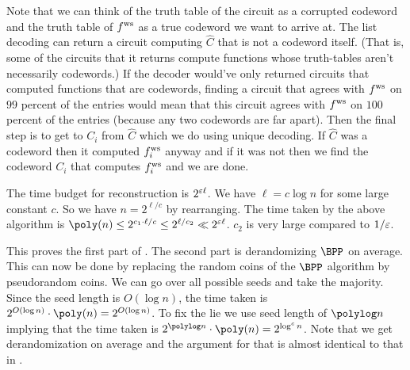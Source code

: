 Note that we can think of the truth table of the circuit as a corrupted codeword and the truth table of $ f^{\text{ws}} $ as a true codeword we want to arrive at. The list decoding can return a circuit computing $\hat{C}$ that is not a codeword itself. (That is, some of the circuits that it returns compute functions whose truth-tables aren't necessarily codewords.) If the decoder would've only returned circuits that computed functions that are codewords, finding a circuit that agrees with $ f^{\text{ws}} $ on $99$ percent of the entries would mean that this circuit agrees with $ f^{\text{ws}} $ on $100$ percent of the entries (because any two codewords are far apart). 
Then the final step is to get to $C_i$ from $\hat{C}$ which we do using unique decoding. If $\hat{C}$ was a codeword then it computed $ f^{\text{ws}} _i$ anyway and if it was not then we find the codeword $C_i$ that computes $ f^{\text{ws}} _i$ and we are done.

The time budget for reconstruction is $2^{\varepsilon \ell}$. We have $\ell=c \log n$ for some large constant $c$. So we have $n= 2^{\ell/c}$ by rearranging. The time taken by the above algorithm is $\poly(n) \leq 2^{c_1 \cdot \ell/c} \leq 2^{\ell/c_2} \ll 2^{\eps \ell}$. $c_2$ is very large compared to $1/\varepsilon$. 

This proves the first part of . The second part is derandomizing $\BPP$ on average. This can now be done by replacing the random coins of the $\BPP$ algorithm by pseudorandom coins. We can go over all possible seeds and take the majority. 
Since the seed length is $O(\log n)$, the time taken is $2^{O(\log n)} \cdot \poly(n) = 2^{O(\log n)}$. 
To fix the lie we use seed length of $\polylog n$ implying that the time taken is $2^{\polylog n} \cdot \poly(n) = 2^{\log^c n}$. 
Note that we get derandomization on average and the argument for that is almost identical to that in .
